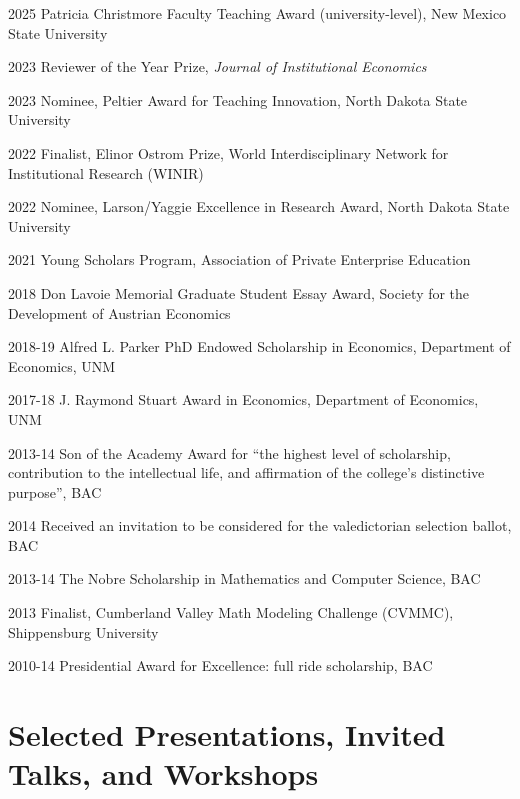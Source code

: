 \documentclass[12pt,letterpaper]{report}
\begin{document}
	\begin{tablist}
            \item [2025] \tab Patricia Christmore Faculty Teaching Award (university-level), New Mexico State University
		\item [2023] \tab Reviewer of the Year Prize, \textit{Journal of Institutional Economics}
            \item [2023] \tab Nominee, Peltier Award for Teaching Innovation, North Dakota State University
	 	\item [2022] \tab Finalist,  Elinor Ostrom Prize, World Interdisciplinary Network for Institutional Research (WINIR)
	 	\item [2022] \tab Nominee, Larson/Yaggie Excellence in Research Award, North Dakota State University
		\item [2021] \tab Young Scholars Program, Association of Private Enterprise Education
		\item [2018] \tab Don Lavoie Memorial Graduate Student Essay Award, Society for the Development of Austrian Economics
		\item [2018-19] \tab Alfred L. Parker PhD Endowed Scholarship in Economics, Department of Economics, UNM
		\item [2017-18] \tab J. Raymond Stuart Award in Economics, Department of Economics, UNM
		\item [2013-14] \tab Son of the Academy Award for ``the highest level of scholarship, contribution to the intellectual life, and affirmation of the college's distinctive purpose'', BAC
		\item [2014] \tab Received an invitation to be considered for the valedictorian selection ballot, BAC
		\item [2013-14] \tab The Nobre Scholarship in Mathematics and Computer Science, BAC
		\item [2013] \tab Finalist, Cumberland Valley Math Modeling Challenge (CVMMC), Shippensburg University
		\item [2010-14] \tab Presidential Award for Excellence: full ride scholarship, BAC




	\end{tablist}


    \section*{Selected Presentations, Invited Talks, and Workshops }
\end{document}
